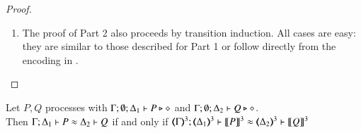 \begin{proof}
\begin{enumerate}
\begin{enumerate}[a)]
	\end{enumerate}

	\item The proof of Part 2 also proceeds by transition induction.
	All cases are easy: they 
	are similar to those described for Part 1
	or
	follow directly from the 
encoding in .
%
%
%
\end{enumerate}
\end{proof}

\begin{proposition}\myrm
	\label{app:prop:fulla_HOpp_to_HOp}
	Let $P, Q$ \HOpp processes with $\Gamma; \emptyset; \Delta_1 \vdash P \triangleright \diamond$ and 
	$\Gamma; \emptyset; \Delta_2 \vdash Q \triangleright \diamond$. \\
	Then 
	$\Gamma; \Delta_1 \vdash P \approx \Delta_2 \vdash Q$ if and only if $\horel{\tmap{\Gamma}{3}}{\tmap{\Delta_1}{3}}{\pmap{P}{3}}{\wb}{\tmap{\Delta_2}{3}}{\pmap{Q}{3}}$
\end{proposition}

